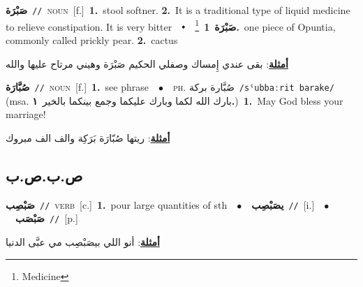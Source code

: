 \documentclass[10pt,a4paper,twoside]{article} %
\begin{document}
\begin{multicols}{2}
{{{{{{\setlength\topsep{0pt}\textbf{\foreignlanguage{arabic}{صَبْرَة}}\ {\color{gray}\texttt{//}\color{black}}\ \textsc{noun}\ [f.]\ \textbf{1.}~stool softner.  \textbf{2.}~It is a traditional type of  liquid medicine to relieve constipation. It is very bitter\ \ $\smblkdiamond$\ \ \setlength\topsep{0pt}\textbf{\foreignlanguage{arabic}{صَبْرَة}}\ \footnote{Medicine}\ \textbf{1.}~one piece of Opuntia, commonly called prickly pear.  \textbf{2.}~cactus\  \begin{flushright}\color{gray}\foreignlanguage{arabic}{\textbf{\underline{\foreignlanguage{arabic}{أمثلة}}}: بقى عندي إِمساك وصفلي الحكيم صَبْرَة وهيني مرتاح عليها والله}\end{flushright}\color{black}} \vspace{2mm}

{\setlength\topsep{0pt}\textbf{\foreignlanguage{arabic}{صُبَّارَة}}\ {\color{gray}\texttt{//}\color{black}}\ \textsc{noun}\ [f.]\ \textbf{1.}~see phrase\ \ $\bullet$\ \ \textsc{ph.} \color{gray} \foreignlanguage{arabic}{صُبَّارة بركة}\color{black}\ {\color{gray}\texttt{/{\sffamily sˤubbaːrit barake}/}\color{black}}\ \color{gray} (msa. \foreignlanguage{arabic}{بارك الله لكما وبارك عليكما وجمع بينكما بالخير}~\foreignlanguage{arabic}{\textbf{١.}})\color{black}\ \textbf{1.}~May God bless your marriage!\  \begin{flushright}\color{gray}\foreignlanguage{arabic}{\textbf{\underline{\foreignlanguage{arabic}{أمثلة}}}: ريتها صُبّارَة بَرَكِة والف الف مبروك}\end{flushright}\color{black}} \vspace{2mm}

\vspace{-3mm}
\subsection*{\color{blue}\foreignlanguage{arabic}{ص.ب.ص.ب}\color{blue}{}} 

{\setlength\topsep{0pt}\textbf{\foreignlanguage{arabic}{صَبْصِب}}\ {\color{gray}\texttt{//}\color{black}}\ \textsc{verb}\ [c.]\ \textbf{1.}~pour large quantities of sth\ \ $\bullet$\ \ \setlength\topsep{0pt}\textbf{\foreignlanguage{arabic}{يصَبْصِب}}\ {\color{gray}\texttt{//}\color{black}}\ [i.]\ \ $\bullet$\ \ \setlength\topsep{0pt}\textbf{\foreignlanguage{arabic}{صَبْصَب}}\ {\color{gray}\texttt{//}\color{black}}\ [p.]\  \begin{flushright}\color{gray}\foreignlanguage{arabic}{\textbf{\underline{\foreignlanguage{arabic}{أمثلة}}}: أنو اللي بيصَبْصِب مي عبَّى الدنيا}\end{flushright}\color{black}} \vspace{2mm}

}}}}}
\end{multicols}
\end{document}
